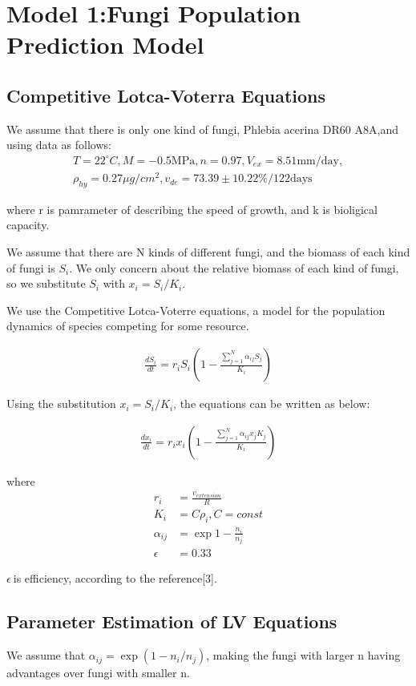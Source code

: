 \section{Model 1:Fungi Population Prediction Model}
		\subsection{Competitive Lotca-Voterra Equations}
        We assume that there is only one kind of fungi, Phlebia acerina DR60 A8A,and using data as follows:
\begin{align}%
    T=22^{\circ}C,M=-0.5\text{MPa},n=0.97,V_{ex}=8.51\text{mm/day},\nonumber\\
    \rho_{hy}=0.27\mu g/cm^2,v_{de}=73.39\pm 10.22\%/122\text{days}\nonumber
\end{align}



where r is pamrameter of describing the speed of growth, and k is bioligical capacity.

We assume that there are N kinds of different fungi, and the biomass of each kind of fungi is $S_i$. We only concern about the relative biomass of each kind of fungi, so we substitute $S_i$ with $x_i=S_i/K_i$.

We use the Competitive Lotca-Voterre equations, a model for the population dynamics of species competing for some resource. 

\begin{align}
    \frac{dS_i}{dt}=r_i S_i  (1- \frac{\sum_{j=1}^{N}\alpha_{ij}S_j}{K_i})
\end{align}

Using the substitution $x_i=S_i/K_i$, the equations can be written as below:

\begin{align}
    \frac{dx_i}{dt}=r_i x_i  (1- \frac{\sum_{j=1}^{N}\alpha_{ij}x_jK_j}{K_i})
\end{align}

where
\begin{align}
    r_i&=\frac{v_{extension}}{R}\\
    K_i&=C\rho_i,C=const\\
    \alpha_{ij}&=\exp{1-\frac{n_i}{n_j}}\\
    \epsilon&=0.33
\end{align}

$\epsilon\:$is efficiency, according to the reference[3].
		\subsection{Parameter Estimation of LV Equations}
        We assume that $\alpha_{ij}=\exp(1-n_i/n_j)$, making the fungi with larger n having advantages over fungi with smaller n.
